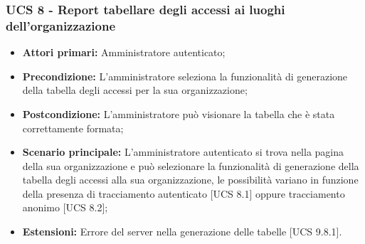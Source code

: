 \subsubsection{UCS 8 - Report tabellare degli accessi ai luoghi dell'organizzazione}%
\begin{itemize}
\item \textbf{Attori primari:} Amministratore autenticato;
\item \textbf{Precondizione:} L'amministratore seleziona la funzionalità di generazione della tabella degli accessi per la sua organizzazione;
\item \textbf{Postcondizione:} L'amministratore può visionare la tabella che è stata correttamente formata;
\item \textbf{Scenario principale:} L'amministratore autenticato si trova nella pagina della sua organizzazione e può selezionare la funzionalità di generazione della tabella degli accessi alla sua organizzazione, le possibilità variano in funzione della presenza di tracciamento autenticato [UCS 8.1] oppure tracciamento anonimo [UCS 8.2];
\item \textbf{Estensioni:} Errore del server nella generazione delle tabelle [UCS 9.8.1].
\end{itemize}

